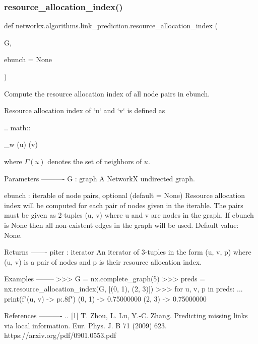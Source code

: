 \subsubsection{\texorpdfstring{resource\+\_\+allocation\+\_\+index()}{resource\_allocation\_index()}}
{\footnotesize\ttfamily def networkx.\+algorithms.\+link\+\_\+prediction.\+resource\+\_\+allocation\+\_\+index (\begin{DoxyParamCaption}\item[{}]{G,  }\item[{}]{ebunch = {\ttfamily None} }\end{DoxyParamCaption})}

\begin{DoxyVerb}Compute the resource allocation index of all node pairs in ebunch.

Resource allocation index of `u` and `v` is defined as

.. math::

    \sum_{w \in \Gamma(u) \cap \Gamma(v)} 

where $\Gamma(u)$ denotes the set of neighbors of $u$.

Parameters
----------
G : graph
    A NetworkX undirected graph.

ebunch : iterable of node pairs, optional (default = None)
    Resource allocation index will be computed for each pair of
    nodes given in the iterable. The pairs must be given as
    2-tuples (u, v) where u and v are nodes in the graph. If ebunch
    is None then all non-existent edges in the graph will be used.
    Default value: None.

Returns
-------
piter : iterator
    An iterator of 3-tuples in the form (u, v, p) where (u, v) is a
    pair of nodes and p is their resource allocation index.

Examples
--------
>>> G = nx.complete_graph(5)
>>> preds = nx.resource_allocation_index(G, [(0, 1), (2, 3)])
>>> for u, v, p in preds:
...     print(f"({u}, {v}) -> {p:.8f}")
(0, 1) -> 0.75000000
(2, 3) -> 0.75000000

References
----------
.. [1] T. Zhou, L. Lu, Y.-C. Zhang.
   Predicting missing links via local information.
   Eur. Phys. J. B 71 (2009) 623.
   https://arxiv.org/pdf/0901.0553.pdf
\end{DoxyVerb}
 \mbox{\label{namespacenetworkx_1_1algorithms_1_1link__prediction_a9b7af17cf19357c55684099957105c67}} 
